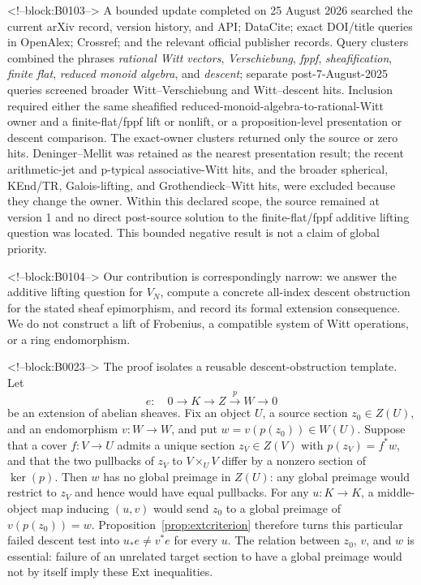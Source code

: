\documentclass[11pt]{article}
\theoremstyle{definition}
\begin{document}
<!--block:B0103-->
A bounded update completed on 25 August 2026 searched the current arXiv
record, version history, and API; DataCite; exact DOI/title queries in
OpenAlex; Crossref; and the relevant official publisher records.  Query
clusters combined the phrases \emph{rational Witt vectors},
\emph{Verschiebung}, \emph{fppf}, \emph{sheafification},
\emph{finite flat}, \emph{reduced monoid algebra}, and \emph{descent};
separate post-7-August-2025 queries screened broader
Witt--Verschiebung and Witt--descent hits.  Inclusion required either the
same sheafified reduced-monoid-algebra-to-rational-Witt owner and a
finite-flat/fppf lift or nonlift, or a proposition-level presentation or
descent comparison.  The exact-owner clusters returned only the source or
zero hits.  Deninger--Mellit was retained as the nearest presentation
result; the recent arithmetic-jet and p-typical associative-Witt hits, and
the broader spherical, KEnd/TR, Galois-lifting, and
Grothendieck--Witt hits, were excluded because they change the owner.
Within this declared scope, the source remained at version 1 and no direct
post-source solution to the finite-flat/fppf additive lifting question was
located.  This bounded negative result is not a claim of global priority.

<!--block:B0104-->
Our contribution is correspondingly narrow: we answer the additive lifting
question for \(V_N\), compute a concrete all-index descent obstruction for
the stated sheaf epimorphism, and record its formal extension consequence.
We do not construct a lift of Frobenius, a compatible system of Witt
operations, or a ring endomorphism.

<!--block:B0023-->
The proof isolates a reusable descent-obstruction template.  Let
\[
 e:\quad 0\longrightarrow K\longrightarrow Z
 \xrightarrow{p}W\longrightarrow0
\]
be an extension of abelian sheaves.  Fix an object \(U\), a source section
\(z_0\in Z(U)\), and an endomorphism \(v\colon W\to W\), and put
\(w=v(p(z_0))\in W(U)\).  Suppose that a cover \(f\colon V\to U\)
admits a unique section \(z_V\in Z(V)\) with \(p(z_V)=f^*w\), and that
the two pullbacks of \(z_V\) to \(V\times_UV\) differ by a nonzero
section of \(\ker(p)\).  Then \(w\) has no global preimage in \(Z(U)\):
any global preimage would restrict to \(z_V\) and hence would have equal
pullbacks.  For any \(u\colon K\to K\), a middle-object map inducing
\((u,v)\) would send \(z_0\) to a global preimage of
\(v(p(z_0))=w\).  Proposition~\ref{prop:extcriterion} therefore turns
this particular failed descent test into \(u_*e\ne v^*e\) for every
\(u\).  The relation between \(z_0\), \(v\), and \(w\) is essential:
failure of an unrelated target section to have a global preimage would not
by itself imply these Ext inequalities.
\end{document}

